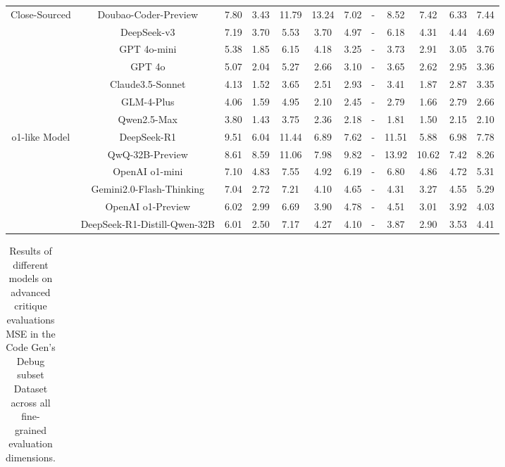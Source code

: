 \documentclass[11pt, a4paper, logo, copyright, nonumbering, amsart]{map}
\begin{document}
\begin{CJK*}{UTF8}{gbsn}
\begin{table*}[h!]
\begin{adjustbox}{width=\textwidth}
\begin{tabular}{c|c|cccccccccc}
    \midrule
    \multirow{7}{*}{Close-Sourced} 
    & Doubao-Coder-Preview & 7.80 & 3.43 & 11.79 & 13.24 & 7.02 & - & 8.52 & 7.42 & 6.33 & 7.44 \\
    & DeepSeek-v3 & 7.19 & 3.70 & 5.53 & 3.70 & 4.97 & - & 6.18 & 4.31 & 4.44 & 4.69 \\
    & GPT 4o-mini & 5.38 & 1.85 & 6.15 & 4.18 & 3.25 & - & 3.73 & 2.91 & 3.05 & 3.76 \\
    & GPT 4o & 5.07 & 2.04 & 5.27 & 2.66 & 3.10 & - & 3.65 & 2.62 & 2.95 & 3.36 \\
    & Claude3.5-Sonnet & 4.13 & 1.52 & 3.65 & 2.51 & 2.93 & - & 3.41 & 1.87 & 2.87 & 3.35 \\
    & GLM-4-Plus & 4.06 & 1.59 & 4.95 & 2.10 & 2.45 & - & 2.79 & 1.66 & 2.79 & 2.66 \\
    & Qwen2.5-Max & 3.80 & 1.43 & 3.75 & 2.36 & 2.18 & - & 1.81 & 1.50 & 2.15 & 2.10 \\
    
    \midrule
    \multirow{6}{*}{o1-like Model} 
    & DeepSeek-R1 & 9.51 & 6.04 & 11.44 & 6.89 & 7.62 & - & 11.51 & 5.88 & 6.98 & 7.78 \\
    & QwQ-32B-Preview & 8.61 & 8.59 & 11.06 & 7.98 & 9.82 & - & 13.92 & 10.62 & 7.42 & 8.26 \\
    & OpenAI o1-mini & 7.10 & 4.83 & 7.55 & 4.92 & 6.19 & - & 6.80 & 4.86 & 4.72 & 5.31 \\
    & Gemini2.0-Flash-Thinking & 7.04 & 2.72 & 7.21 & 4.10 & 4.65 & - & 4.31 & 3.27 & 4.55 & 5.29 \\
    & OpenAI o1-Preview & 6.02 & 2.99 & 6.69 & 3.90 & 4.78 & - & 4.51 & 3.01 & 3.92 & 4.03 \\
    & DeepSeek-R1-Distill-Qwen-32B & 6.01 & 2.50 & 7.17 & 4.27 & 4.10 & - & 3.87 & 2.90 & 3.53 & 4.41 \\
    \bottomrule
    \end{tabular}
    \end{adjustbox}
\end{table*}

\begin{table*}[h!]
    \centering
    \caption{Results of different models on advanced critique evaluations MSE in the Code Gen's Debug subset Dataset across all fine-grained evaluation dimensions.} \label{table:algo_level2_debug_dim}
    \begin{adjustbox}{width=\textwidth}
    \begin{tabular}{c|c|cccccccccc}
    

\end{tabular}
\end{adjustbox}
\end{table*}
\end{CJK*}
\end{document}
